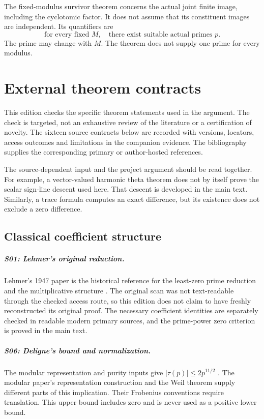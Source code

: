 The fixed-modulus survivor theorem concerns the actual joint finite image, including the cyclotomic factor. It does not assume that its constituent images are independent. Its quantifiers are
\[
\text{for every fixed }M,\quad \text{there exist suitable actual primes }p.
\]
The prime may change with $M$. The theorem does not supply one prime for every modulus.




\chapter{External theorem contracts}\label{app:sources}

This edition checks the specific theorem statements used in the argument. The check is targeted, not an exhaustive review of the literature or a certification of novelty. The sixteen source contracts below are recorded with versions, locators, access outcomes and limitations in the companion evidence. The bibliography supplies the corresponding primary or author-hosted references.

The source-dependent input and the project argument should be read together. For example, a vector-valued harmonic theta theorem does not by itself prove the scalar sign-line descent used here. That descent is developed in the main text. Similarly, a trace formula computes an exact difference, but its existence does not exclude a zero difference.

\section{Classical coefficient structure}
\paragraph{S01: Lehmer's original reduction.}
Lehmer's 1947 paper is the historical reference for the least-zero prime reduction and the multiplicative structure \cite{Lehmer}. The original scan was not text-readable through the checked access route, so this edition does not claim to have freshly reconstructed its original proof. The necessary coefficient identities are separately checked in readable modern primary sources, and the prime-power zero criterion is proved in the main text.

\paragraph{S06: Deligne's bound and normalization.}
The modular representation and purity inputs give $|\tau(p)|\le2p^{11/2}$ \cite{DeligneModular,DeligneWeil}. The modular paper's representation construction and the Weil theorem supply different parts of this implication. Their Frobenius conventions require translation. This upper bound includes zero and is never used as a positive lower bound.

